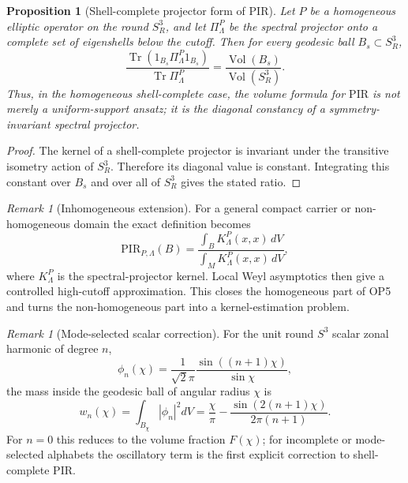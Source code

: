 \documentclass[11pt,a4paper]{article}
\newtheorem{proposition}[theorem]{Proposition}
\theoremstyle{definition}
\theoremstyle{remark}
\newtheorem{remark}[theorem]{Remark}
\newcommand{\Sthree}{S^{3}}
\newcommand{\PIR}{\mathrm{PIR}}
\begin{document}
\begin{proposition}[Shell-complete projector form of PIR]
\label{prop:shell-pir}
Let $P$ be a homogeneous elliptic operator on the round $\Sthree_R$, and let
$\Pi_{\Lambda}^{P}$ be the spectral projector onto a complete set of eigenshells below the
cutoff.  Then for every geodesic ball $B_s\subset \Sthree_R$,
\[
\frac{\operatorname{Tr}(1_{B_s}\Pi_{\Lambda}^{P}1_{B_s})}
{\operatorname{Tr}\Pi_{\Lambda}^{P}}
=
\frac{\operatorname{Vol}(B_s)}{\operatorname{Vol}(\Sthree_R)}.
\]
Thus, in the homogeneous shell-complete case, the volume formula for $\PIR$ is not merely a
uniform-support ansatz; it is the diagonal constancy of a symmetry-invariant spectral
projector.
\end{proposition}

\begin{proof}
The kernel of a shell-complete projector is invariant under the transitive isometry action of
$\Sthree_R$.  Therefore its diagonal value is constant.  Integrating this constant over
$B_s$ and over all of $\Sthree_R$ gives the stated ratio.
\end{proof}

\begin{remark}[Inhomogeneous extension]
For a general compact carrier or non-homogeneous domain the exact definition becomes
\[
\PIR_{P,\Lambda}(B)=
\frac{\int_B K_{\Lambda}^{P}(x,x)\,dV}{\int_M K_{\Lambda}^{P}(x,x)\,dV},
\]
where $K_{\Lambda}^{P}$ is the spectral-projector kernel.  Local Weyl asymptotics then give a
controlled high-cutoff approximation.  This closes the homogeneous part of OP5 and turns the
non-homogeneous part into a kernel-estimation problem.
\end{remark}

\begin{remark}[Mode-selected scalar correction]
For the unit round $\Sthree$ scalar zonal harmonic of degree $n$,
\[
\phi_n(\chi)=\frac{1}{\sqrt 2\pi}\frac{\sin((n+1)\chi)}{\sin\chi},
\]
the mass inside the geodesic ball of angular radius $\chi$ is
\[
w_n(\chi)=\int_{B_\chi}|\phi_n|^2dV
=\frac{\chi}{\pi}-\frac{\sin(2(n+1)\chi)}{2\pi(n+1)}.
\]
For $n=0$ this reduces to the volume fraction $F(\chi)$; for incomplete or mode-selected
alphabets the oscillatory term is the first explicit correction to shell-complete PIR.
\end{remark}
\end{document}

